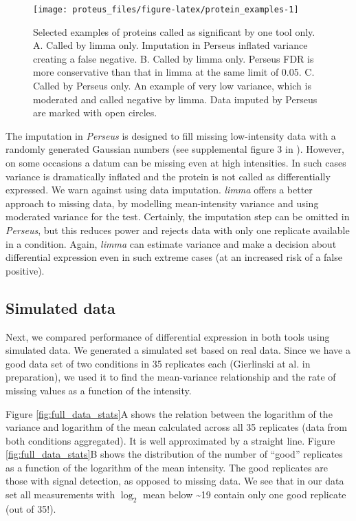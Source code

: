 \documentclass[]{article}
\begin{document}
\begin{figure}[H]

{\centering \texttt{[image: proteus\_files/figure-latex/protein\_examples-1]} 

}

\caption{\label{fig:protein_examples}Selected examples of proteins called as significant by one tool only. A. Called by limma only. Imputation in Perseus inflated variance creating a false negative. B. Called by limma only. Perseus FDR is more conservative than that in limma at the same limit of 0.05. C. Called by Perseus only. An example of very low variance, which is moderated and called negative by limma. Data imputed by Perseus are marked with open circles.}\label{fig:protein_examples}
\end{figure}

The imputation in \emph{Perseus} is designed to fill missing
low-intensity data with a randomly generated Gaussian numbers (see
supplemental figure 3 in \citet{tyanova2016}). However, on some
occasions a datum can be missing even at high intensities. In such cases
variance is dramatically inflated and the protein is not called as
differentially expressed. We warn against using data imputation.
\emph{limma} offers a better approach to missing data, by modelling
mean-intensity variance and using moderated variance for the test.
Certainly, the imputation step can be omitted in \emph{Perseus}, but
this reduces power and rejects data with only one replicate available in
a condition. Again, \emph{limma} can estimate variance and make a
decision about differential expression even in such extreme cases (at an
increased risk of a false positive).

\subsection{Simulated data}\label{simulated-data}

Next, we compared performance of differential expression in both tools
using simulated data. We generated a simulated set based on real data.
Since we have a good data set of two conditions in 35 replicates each
(Gierlinski at al. in preparation), we used it to find the mean-variance
relationship and the rate of missing values as a function of the
intensity.

Figure \ref{fig:full_data_stats}A shows the relation between the
logarithm of the variance and logarithm of the mean calculated across
all 35 replicates (data from both conditions aggregated). It is well
approximated by a straight line. Figure \ref{fig:full_data_stats}B shows
the distribution of the number of ``good'' replicates as a function of
the logarithm of the mean intensity. The good replicates are those with
signal detection, as opposed to missing data. We see that in our data
set all measurements with \(\log_2\) mean below \textasciitilde{}19
contain only one good replicate (out of 35!).
\end{document}
